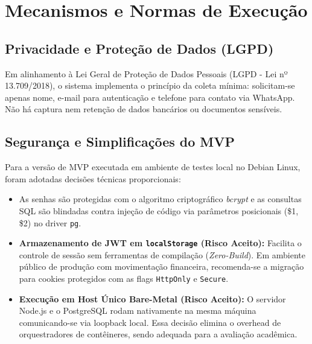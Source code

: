 \documentclass[12pt,a4paper]{article}
\begin{document}
\newpage


\section{Mecanismos e Normas de Execução}

\subsection{Privacidade e Proteção de Dados (LGPD)}

Em alinhamento à Lei Geral de Proteção de Dados Pessoais (LGPD - Lei nº 13.709/2018), o sistema implementa o princípio da coleta mínima: solicitam-se apenas nome, e-mail para autenticação e telefone para contato via WhatsApp. Não há captura nem retenção de dados bancários ou documentos sensíveis.

\subsection{Segurança e Simplificações do MVP}

Para a versão de MVP executada em ambiente de testes local no Debian Linux, foram adotadas decisões técnicas proporcionais:

\begin{itemize}[leftmargin=1.5cm]

    \item As senhas são protegidas com o algoritmo criptográfico \textit{bcrypt} e as consultas SQL são blindadas contra injeção de código via parâmetros posicionais (\$1, \$2) no driver \texttt{pg}.

    \item \textbf{Armazenamento de JWT em \texttt{localStorage} (Risco Aceito):} Facilita o controle de sessão sem ferramentas de compilação (\textit{Zero-Build}). Em ambiente público de produção com movimentação financeira, recomenda-se a migração para cookies protegidos com as flags \texttt{HttpOnly} e \texttt{Secure}.

    \item \textbf{Execução em Host Único Bare-Metal (Risco Aceito):} O servidor Node.js e o PostgreSQL rodam nativamente na mesma máquina comunicando-se via loopback local. Essa decisão elimina o overhead de orquestradores de contêineres, sendo adequada para a avaliação acadêmica.

\end{itemize}
\end{document}
